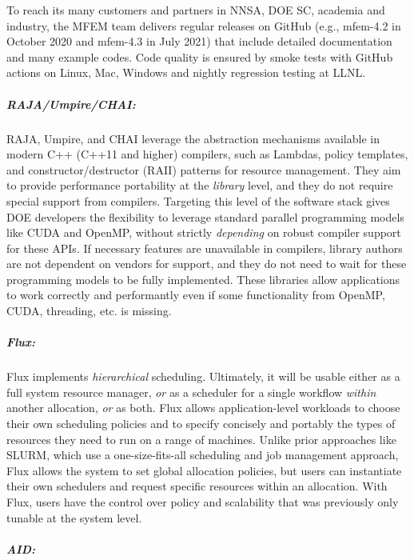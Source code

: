 To reach its many customers and partners in NNSA, DOE SC,
academia and industry, the MFEM team delivers regular releases on GitHub
(e.g., mfem-4.2 in October 2020 and mfem-4.3 in July 2021) that include
detailed documentation and many example codes.  Code quality is ensured
by smoke tests with GitHub actions on Linux, Mac, Windows and nightly
regression testing at LLNL.

\subparagraph{RAJA/Umpire/CHAI:}
RAJA, Umpire, and CHAI leverage the abstraction mechanisms available in
modern C++ (C++11 and higher) compilers, such as Lambdas, policy
templates, and constructor/destructor (RAII) patterns for resource
management.  They aim to provide performance portability at the {\it
library} level, and they do not require special support from compilers.
Targeting this level of the software stack gives DOE developers the
flexibility to leverage standard parallel programming models like CUDA
and OpenMP, without strictly {\it depending} on robust compiler support
for these APIs.  If necessary features are unavailable in compilers,
library authors are not dependent on vendors for support, and they do not
need to wait for these programming models to be fully implemented.  These
libraries allow applications to work correctly and performantly even if
some functionality from OpenMP, CUDA, threading, etc. is missing.

\subparagraph{Flux:}
Flux implements {\it hierarchical} scheduling.  Ultimately, it will be
usable either as a full system resource manager, {\it or} as a scheduler
for a single workflow {\it within} another allocation, {\it or} as both.
Flux allows application-level workloads to choose their own scheduling
policies and to specify concisely and portably the types of resources
they need to run on a range of machines.  Unlike prior approaches like
SLURM, which use a one-size-fits-all scheduling and job management
approach, Flux allows the system to set global allocation policies, but
users can instantiate their own schedulers and request specific resources
within an allocation.  With Flux, users have the control over policy and
scalability that was previously only tunable at the system level.

\subparagraph{AID:}

